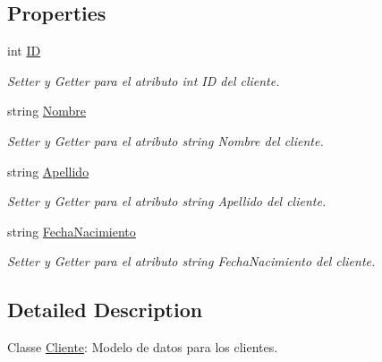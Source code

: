 \subsection*{Properties}
\begin{DoxyCompactItemize}
\item 
int \mbox{\hyperlink{class_ejem___mantenimiento___personas_1_1_cliente_ae229bd0285e992ec0170c930ea508dc6}{ID}}
\begin{DoxyCompactList}\small\item\em Setter y Getter para el atributo int ID del cliente. \end{DoxyCompactList}\item 
string \mbox{\hyperlink{class_ejem___mantenimiento___personas_1_1_cliente_abfd662cc9b3f46750983780c39dc6aef}{Nombre}}
\begin{DoxyCompactList}\small\item\em Setter y Getter para el atributo string Nombre del cliente. \end{DoxyCompactList}\item 
string \mbox{\hyperlink{class_ejem___mantenimiento___personas_1_1_cliente_ac0182fb39e68117ec4aa6a35902d4f26}{Apellido}}
\begin{DoxyCompactList}\small\item\em Setter y Getter para el atributo string Apellido del cliente. \end{DoxyCompactList}\item 
string \mbox{\hyperlink{class_ejem___mantenimiento___personas_1_1_cliente_a7c8f3f7bd7733225040113148b71884e}{Fecha\+Nacimiento}}
\begin{DoxyCompactList}\small\item\em Setter y Getter para el atributo string Fecha\+Nacimiento del cliente. \end{DoxyCompactList}\end{DoxyCompactItemize}


\subsection{Detailed Description}
Classe \mbox{\hyperlink{class_ejem___mantenimiento___personas_1_1_cliente}{Cliente}}\+: Modelo de datos para los clientes. 



